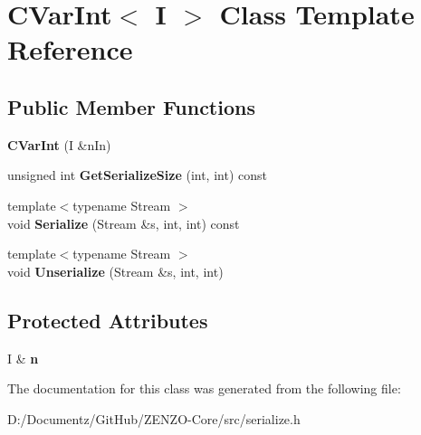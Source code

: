 \hypertarget{class_c_var_int}{}\section{C\+Var\+Int$<$ I $>$ Class Template Reference}
\label{class_c_var_int}
\subsection*{Public Member Functions}
\begin{DoxyCompactItemize}
\item 
\mbox{\label{class_c_var_int_ab26b9de1b43d4b9ce844eaa7cf6a6b4f}} 
{\bfseries C\+Var\+Int} (I \&n\+In)
\item 
\mbox{\label{class_c_var_int_af994978b1b95a6b5d3009f5743ca6053}} 
unsigned int {\bfseries Get\+Serialize\+Size} (int, int) const
\item 
\mbox{\label{class_c_var_int_a3b772eba5c6cd5b9ad7cec9cb45f7cb2}} 
{\footnotesize template$<$typename Stream $>$ }\\void {\bfseries Serialize} (Stream \&s, int, int) const
\item 
\mbox{\label{class_c_var_int_aba87b78443378273b4f335dcd858c29c}} 
{\footnotesize template$<$typename Stream $>$ }\\void {\bfseries Unserialize} (Stream \&s, int, int)
\end{DoxyCompactItemize}
\subsection*{Protected Attributes}
\begin{DoxyCompactItemize}
\item 
\mbox{\label{class_c_var_int_a4514adc82b41754d9ac22ee627744614}} 
I \& {\bfseries n}
\end{DoxyCompactItemize}


The documentation for this class was generated from the following file\+:\begin{DoxyCompactItemize}
\item 
D\+:/\+Documentz/\+Git\+Hub/\+Z\+E\+N\+Z\+O-\/\+Core/src/serialize.\+h\end{DoxyCompactItemize}

